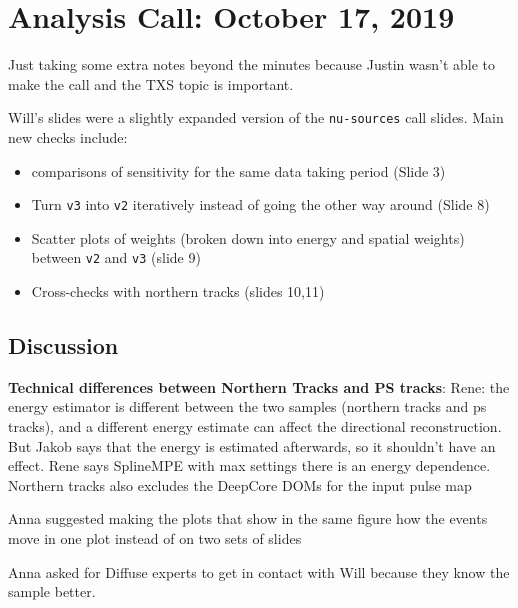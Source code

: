 \chapter{Analysis Call: October 17, 2019}

Just taking some extra notes beyond the minutes because Justin wasn't able to make the call and the TXS topic is important.

Will's slides were a slightly expanded version of the \texttt{nu-sources} call slides. Main new checks include:

\begin{itemize}
    \item comparisons of sensitivity for the same data taking period (Slide 3)
    \item Turn \texttt{v3} into \texttt{v2} iteratively instead of going the other way around (Slide 8)
    \item Scatter plots of weights (broken down into energy and spatial weights) between \texttt{v2} and \texttt{v3} (slide 9)
    \item Cross-checks with northern tracks (slides 10,11)
\end{itemize}

\section{Discussion}
\textbf{Technical differences between Northern Tracks and PS tracks}: Rene: the energy estimator is different between the two samples (northern tracks and ps tracks), and a different energy estimate can affect the directional reconstruction. But Jakob says that the energy is estimated afterwards, so it shouldn't have an effect. Rene says SplineMPE with max settings there is an energy dependence. Northern tracks also excludes the DeepCore DOMs for the input pulse map

Anna suggested making the plots that show in the same figure how the events move in one plot instead of on two sets of slides

Anna asked for Diffuse experts to get in contact with Will because they know the sample better. 